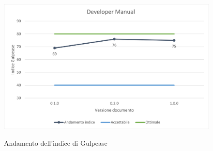 \begin{figure}[H]
\centering
\includegraphics[scale=0.78]{res/ResocontoAttivitaDiVerifica/res/metriche/grafici/img/gulpeaseDM.png}\\
\caption{Andamento dell'indice di Gulpease \MM}
\end{figure}

